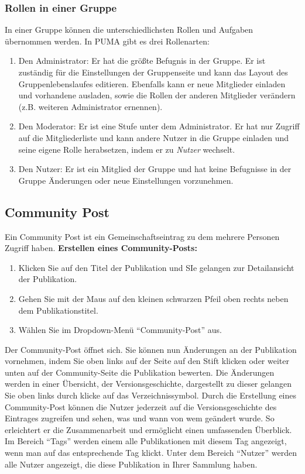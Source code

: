 \documentclass[a4paper,11pt,twoside]{scrbook}
\begin{document}
\subsubsection{Rollen in einer Gruppe}
In einer Gruppe können die unterschiedlichsten Rollen und Aufgaben übernommen werden. In PUMA gibt es drei Rollenarten:
\begin{enumerate}
    \item Den Administrator: Er hat die größte Befugnis in der Gruppe. Er ist zuständig für die Einstellungen der Gruppenseite und kann das Layout des Gruppenlebenslaufes editieren. Ebenfalls kann er neue Mitglieder einladen und vorhandene ausladen, sowie die Rollen der anderen Mitglieder verändern (z.B. weiteren Administrator ernennen).
    \item Den Moderator: Er ist eine Stufe unter dem Administrator. Er hat nur Zugriff auf die Mitgliederliste und kann andere Nutzer in die Gruppe einladen und seine eigene Rolle herabsetzen, indem er zu \textit{Nutzer} wechselt.
    \item Den Nutzer: Er ist ein Mitglied der Gruppe und hat keine Befugnisse in der Gruppe Änderungen oder neue Einstellungen vorzunehmen.
\end{enumerate}

\subsection{Community Post}
Ein Community Post ist ein Gemeinschaftseintrag zu dem mehrere Personen Zugriff haben. \newline \newline
\textbf{Erstellen eines Community-Posts:}
\begin{enumerate}
	\item Klicken Sie auf den Titel der Publikation und SIe gelangen zur Detailansicht der Publikation. 
	\item Gehen Sie mit der Maus auf den kleinen schwarzen Pfeil oben rechts neben dem Publikationstitel. 
	\item Wählen Sie im Dropdown-Menü \enquote{Community-Post} aus. \end{enumerate}
Der Community-Post öffnet sich. Sie können nun Änderungen an der Publikation vornehmen, indem Sie oben links auf der Seite auf den Stift klicken oder weiter unten auf der Community-Seite die Publikation bewerten. Die Änderungen werden in einer Übersicht, der Versionsgeschichte, dargestellt zu dieser gelangen Sie oben links durch klicke auf das Verzeichnissymbol.\newline
Durch die Erstellung eines Community-Post können die Nutzer jederzeit auf die Versionsgeschichte des Eintrages zugreifen und sehen, was und wann von wem geändert wurde. So erleichtert er die Zusammenarbeit und ermöglicht einen umfassenden Überblick. \newline
Im Bereich \enquote{Tags} werden einem alle Publikationen mit diesem Tag angezeigt, wenn man auf das entsprechende Tag klickt. \newline
Unter dem Bereich \enquote{Nutzer} werden alle Nutzer angezeigt, die diese Publikation in Ihrer Sammlung haben.
\end{document}
